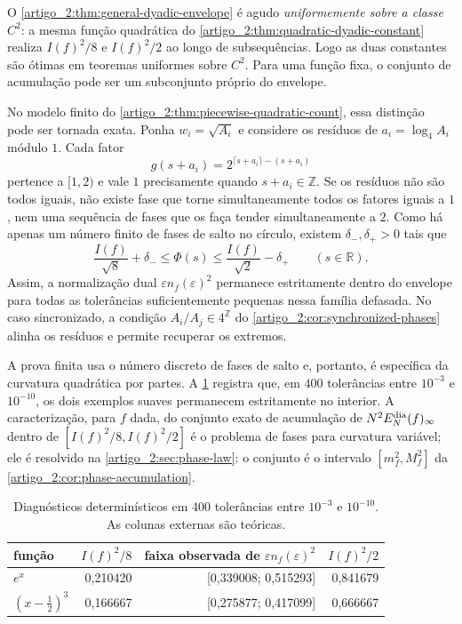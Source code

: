 \begin{remark}\label{map:artigo_2:12.4}
\label{artigo_2:rem:envelope-not-pointwise}
O \cref{artigo_2:thm:general-dyadic-envelope} é agudo \emph{uniformemente sobre a
classe} $C^2$: a mesma função quadrática do
\cref{artigo_2:thm:quadratic-dyadic-constant} realiza $I(f)^2/8$ e $I(f)^2/2$ ao longo
de subsequências. Logo as duas constantes são ótimas em teoremas uniformes
sobre $C^2$. Para uma função fixa, o conjunto de acumulação pode ser um
subconjunto próprio do envelope.

No modelo finito do \cref{artigo_2:thm:piecewise-quadratic-count}, essa distinção pode
ser tornada exata. Ponha $w_i=\sqrt{A_i}$ e considere os resíduos de
$a_i=\log_4A_i$ módulo $1$. Cada fator
\[
 g(s+a_i)=2^{\lceil s+a_i\rceil-(s+a_i)}
\]
pertence a $[1,2)$ e vale $1$ precisamente quando $s+a_i\in\mathbb Z$. Se os
resíduos não são todos iguais, não existe fase que torne simultaneamente
todos os fatores iguais a $1$, nem uma sequência de fases que os faça tender
simultaneamente a $2$. Como há apenas um número finito de fases de salto no
círculo, existem $\delta_-,\delta_+>0$ tais que
\[
 \frac{I(f)}{\sqrt8}+\delta_-
 \le \Phi(s)
 \le \frac{I(f)}{\sqrt2}-\delta_+
 \qquad(s\in\mathbb R).
\]
Assim, a normalização dual $\varepsilon n_f(\varepsilon)^2$ permanece
estritamente dentro do envelope para todas as tolerâncias suficientemente
pequenas nessa família defasada. No caso sincronizado, a condição
$A_i/A_j\in4^{\mathbb Z}$ do \cref{artigo_2:cor:synchronized-phases} alinha os
resíduos e permite recuperar os extremos.

A prova finita usa o número discreto de fases de salto e, portanto, é
específica da curvatura quadrática por partes. A
\cref{artigo_2:tab:smooth-diagnostics} registra que, em $400$ tolerâncias entre
$10^{-3}$ e $10^{-10}$, os dois exemplos suaves permanecem estritamente no
interior. A caracterização, para $f$ dada, do conjunto exato de acumulação de
$N^2E_N^{\rm dia}(f)_\infty$ dentro de
$[I(f)^2/8,\allowbreak I(f)^2/2]$ é o problema de fases para curvatura
variável; ele é resolvido na \cref{artigo_2:sec:phase-law}: o conjunto é o
intervalo $[m_f^2,M_f^2]$ da \cref{artigo_2:cor:phase-accumulation}.
\end{remark}

\begin{table}[t]
 \centering
 \caption{Diagnósticos determinísticos em 400 tolerâncias entre
 $10^{-3}$ e $10^{-10}$. As colunas externas são teóricas.}
 \label{artigo_2:tab:smooth-diagnostics}
 \small
 \begin{tabular}{lrrr}
\toprule
função & $I(f)^2/8$ & faixa observada de $\varepsilon n_f(\varepsilon)^2$ & $I(f)^2/2$ \\
\midrule
$e^x$ & 0{,}210420 & [0{,}339008; 0{,}515293] & 0{,}841679 \\
$(x-\frac{1}{2})^3$ & 0{,}166667 & [0{,}275877; 0{,}417099] & 0{,}666667 \\
\bottomrule
\end{tabular}

\end{table}

